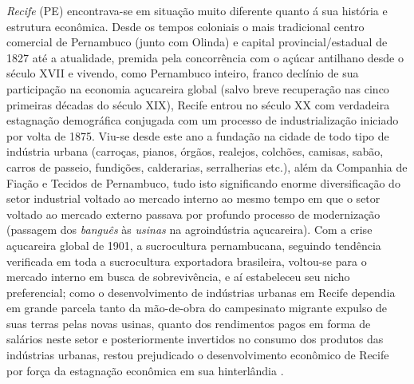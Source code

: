 \textit{Recife} (PE) encontrava-se em situação muito diferente quanto á sua história e estrutura econômica. Desde os tempos coloniais o mais tradicional centro comercial de Pernambuco (junto com Olinda) e capital provincial/estadual de 1827 até a atualidade, premida pela concorrência com o açúcar antilhano desde o século XVII e vivendo, como Pernambuco inteiro, franco declínio de sua participação na economia açucareira global (salvo breve recuperação nas cinco primeiras décadas do século XIX), Recife entrou no século XX com verdadeira estagnação demográfica conjugada com um processo de industrialização iniciado por volta de 1875. Viu-se desde este ano a fundação na cidade de todo tipo de indústria urbana (carroças, pianos, órgãos, realejos, colchões, camisas, sabão, carros de passeio, fundições, calderarias, serralherias etc.), além da Companhia de Fiação e Tecidos de Pernambuco, tudo isto significando enorme diversificação do setor industrial voltado ao mercado interno ao mesmo tempo em que o setor voltado ao mercado externo passava por profundo processo de modernização (passagem dos \textit{banguês} às \textit{usinas} na agroindústria açucareira). Com a crise açucareira global de 1901, a sucrocultura pernambucana, seguindo tendência verificada em toda a sucrocultura exportadora brasileira, voltou-se para o mercado interno em busca de sobrevivência, e aí estabeleceu seu nicho preferencial; como o desenvolvimento de indústrias urbanas em Recife dependia em grande parcela tanto da mão-de-obra do campesinato migrante expulso de suas terras pelas novas usinas, quanto dos rendimentos pagos em forma de salários neste setor e posteriormente invertidos no consumo dos produtos das indústrias urbanas, restou prejudicado o desenvolvimento econômico de Recife por força da estagnação econômica em sua hinterlândia \cite[p.~271-331]{singer_evourb_1968}. 

